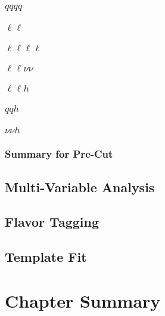 \subsubsection{$qqqq$}
\subsubsection{$\ell\ell$}
\subsubsection{$\ell\ell\ell\ell$}
\subsubsection{$\ell\ell\nu\nu$}
\subsubsection{$\ell{\ell}h$}
\subsubsection{$qqh$}
\subsubsection{$\nu{\nu}h$}
\subsubsection{Summary for Pre-Cut}

\subsection{Multi-Variable Analysis}

\subsection{Flavor Tagging}

\subsection{Template Fit}

\section{Chapter Summary}

